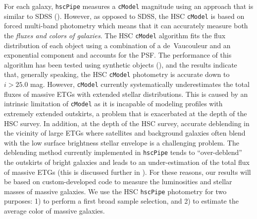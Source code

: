 \documentclass[a4paper,fleqn,usenatbib]{mnras}
\def\cmodel{\texttt{cModel}}
\begin{document}
    For each galaxy, \texttt{hscPipe} measures a \cmodel{} magnitude using an approach 
    that is similar to SDSS (\citealt{Bosch2017}). 
    However, as opposed to SDSS, the HSC \cmodel{} is based on forced multi-band 
    photometry which means that it can accurately measure both the 
    \textit{fluxes and colors of galaxies}. 
    The HSC \cmodel{} algorithm fits the flux distribution of each object using a 
    combination of a de~Vaucouleur and an exponential component and accounts for the PSF. 
    The performance of this algorithm has been tested using synthetic objects 
    (\citealt{SynPipe}), and the results indicate that, generally speaking, 
    the HSC \cmodel{} photometry is accurate down to $i >25.0$ mag.  
    However, \cmodel{} currently systematically underestimates the total fluxes of 
    massive ETGs with extended stellar distributions. 
    This is caused by an intrinsic limitation of \cmodel{} as it is incapable of
    modeling profiles with extremely extended outskirts, a problem that is exacerbated 
    at the depth of the HSC survey. 
    In addition, at the depth of the HSC survey, accurate deblending in the vicinity of
    large ETGs where satellites and background galaxies often blend with the low surface 
    brightness stellar envelope is a challenging problem. 
    The deblending method currently implemented in \texttt{hscPipe} tends to 
    ``over-deblend'' the outskirts of bright galaxies and leads to an 
    under-estimation of the total flux of massive ETGs (this is discussed further in 
    \citealt{Bosch2017}).  
    For these reasons, our results will be based on custom-developed code to measure 
    the luminosities and stellar masses of massive galaxies. 
    We use the HSC \texttt{hscPipe} photometry for two purposes: 
    1) to perform a first broad sample selection, and 2) to estimate the average 
    color of massive galaxies.
\end{document}
